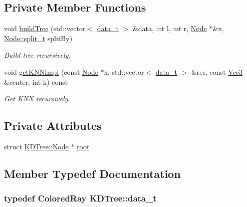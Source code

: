 \subsection*{Private Member Functions}
\begin{DoxyCompactItemize}
\item 
void \hyperlink{classKDTree_a4862664dcb6ac6ddc21a5447721ebab7}{build\+Tree} (std\+::vector$<$ \hyperlink{classKDTree_ab000d86d0fb4aaedcc83b5b7a584c25e}{data\+\_\+t} $>$ \&data, int l, int r, \hyperlink{structKDTree_1_1Node}{Node} $\ast$\&x, \hyperlink{structKDTree_1_1Node_ab21ae38de8fe0e25d29d0ae136a1db34}{Node\+::split\+\_\+t} split\+By)
\begin{DoxyCompactList}\small\item\em Build tree recursively. \end{DoxyCompactList}\item 
void \hyperlink{classKDTree_a5fed302ab0121b6903d60d1ae46a7654}{get\+K\+N\+N\+Impl} (const \hyperlink{structKDTree_1_1Node}{Node} $\ast$x, std\+::vector$<$ \hyperlink{classKDTree_ab000d86d0fb4aaedcc83b5b7a584c25e}{data\+\_\+t} $>$ \&res, const \hyperlink{vec_8h_ae4fcaa7c0a3935930ed1be5f70b90373}{Vec3} \&center, int k) const 
\begin{DoxyCompactList}\small\item\em Get K\+NN recursively. \end{DoxyCompactList}\end{DoxyCompactItemize}
\subsection*{Private Attributes}
\begin{DoxyCompactItemize}
\item 
struct \hyperlink{structKDTree_1_1Node}{K\+D\+Tree\+::\+Node} $\ast$ \hyperlink{classKDTree_af6c514e842e138504160e8d14fa084f7}{root}
\end{DoxyCompactItemize}


\subsection{Member Typedef Documentation}
\subsubsection[{\texorpdfstring{data\+\_\+t}{data_t}}]{\setlength{\rightskip}{0pt plus 5cm}typedef {\bf Colored\+Ray} {\bf K\+D\+Tree\+::data\+\_\+t}}\hypertarget{classKDTree_ab000d86d0fb4aaedcc83b5b7a584c25e}{}\label{classKDTree_ab000d86d0fb4aaedcc83b5b7a584c25e}


